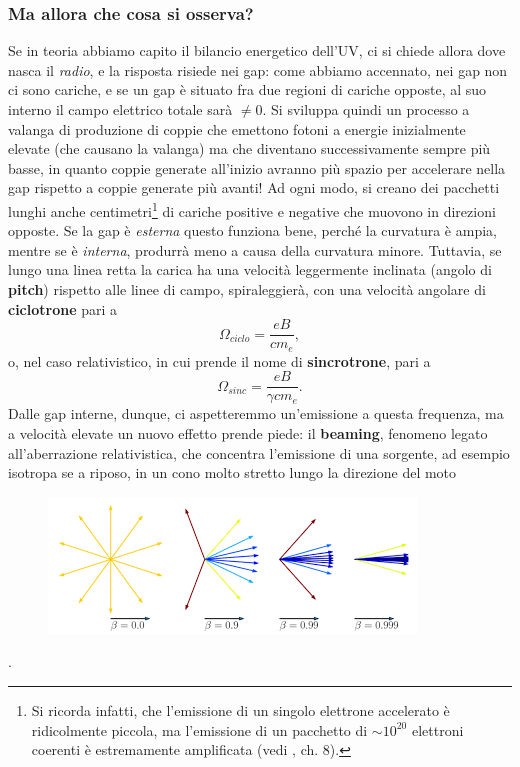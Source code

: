 \subsubsection{Ma allora che cosa si osserva?}
Se in teoria abbiamo capito il bilancio energetico dell'UV, ci si chiede allora dove nasca il \textit{radio}, e la risposta risiede nei gap:
come abbiamo accennato, nei gap non ci sono cariche, e se un gap è situato fra due regioni di cariche opposte, al suo interno il campo elettrico totale sarà $\not=0$. 
Si sviluppa quindi un processo a valanga di produzione di coppie che emettono fotoni a energie inizialmente elevate (che causano la valanga) ma che diventano successivamente sempre più basse, in quanto coppie generate all'inizio avranno più spazio per accelerare nella gap rispetto a coppie generate più avanti!
Ad ogni modo, si creano dei pacchetti lunghi anche centimetri\footnote{Si ricorda infatti, che l'emissione di un singolo elettrone accelerato è ridicolmente piccola, ma l'emissione di un pacchetto di $\sim10^{20}$ elettroni coerenti è estremamente amplificata (vedi \cite{Bradt}, ch. 8).} di cariche positive e negative che muovono in direzioni opposte.
Se la gap è \textit{esterna} questo funziona bene, perché la curvatura è ampia, mentre se è \textit{interna}, produrrà meno a causa della curvatura minore.
Tuttavia, se lungo una linea retta la carica ha una velocità leggermente inclinata (angolo di \textbf{pitch}) rispetto alle linee di campo, spiraleggierà, con una velocità angolare di \textbf{ciclotrone} pari a
\begin{equation}
    \Omega_{ciclo} = \frac{eB}{cm_e},
    \label{eq: ciclotrone}
\end{equation}
o, nel caso relativistico, in cui prende il nome di \textbf{sincrotrone}, pari a 
\begin{equation}
    \Omega_{sinc}=\frac{eB}{\gamma cm_e}.
    \label{eq: sincrotrone}
\end{equation}
Dalle gap interne, dunque, ci aspetteremmo un'emissione a questa frequenza, ma a velocità elevate un nuovo effetto prende piede: il \textbf{beaming}, fenomeno legato all'aberrazione relativistica, che concentra l'emissione di una sorgente, ad esempio isotropa se a riposo, in un cono molto stretto lungo la direzione del moto
\begin{figure}[h!]
    \centering
    \includegraphics[width=0.5\linewidth]{Immagini/beaming iso source.png}
    \label{fig: beaming sorgente isotropa}
\end{figure}.\\
